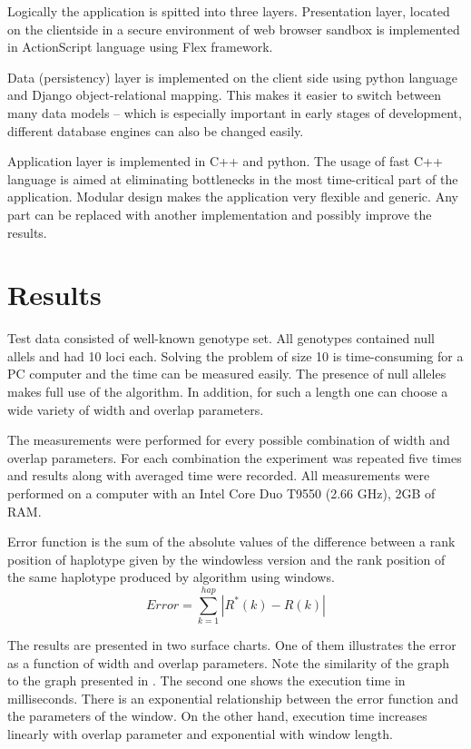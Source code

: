 \documentclass{llncs}
\begin{document}
Logically the application is spitted into three layers. 
Presentation layer, located on the clientside in a secure environment of web browser sandbox is implemented in ActionScript language using Flex framework. 


Data (persistency) layer is implemented on the client side using python language and Django object-relational mapping. 
This makes it easier to switch between many data models -- which is especially important in early stages of development, different database engines can also be changed easily.

Application layer is implemented in C++ and python. 
The usage of fast C++ language is aimed at eliminating bottlenecks in the most time-critical part of the application.
Modular design makes the application very flexible and generic. 
Any part can be replaced with another implementation and possibly improve the results. 


\section{Results}

Test data consisted of well-known genotype set. 
All genotypes contained null allels and had 10 loci each.
Solving the problem of size 10 is time-consuming for a PC computer and the time can be measured easily.
The presence of null alleles makes full use of the algorithm. 
In addition, for such a length one can choose a wide variety of width and overlap parameters.

The measurements were performed for every possible combination of width and overlap parameters.
For each combination the experiment was repeated five times and results along with averaged time were recorded.
All measurements were performed on a computer with an Intel Core Duo T9550 (2.66 GHz), 2GB of RAM.

Error function is the sum of the absolute values ​​of the difference between a rank position of haplotype given by the windowless version and the rank position of the same haplotype produced by algorithm using windows.
$$ Error = \sum_{k=1}^{hap} |R^{*}(k) - R(k)|$$

The results are presented in two surface charts.
One of them illustrates the error as a function of width and overlap parameters.
Note the similarity of the graph to the graph presented in \cite{gusev}.
The second one shows the execution time in milliseconds.
There is an exponential relationship between the error function and the parameters of the window.
On the other hand, execution time increases linearly with overlap parameter and exponential with window length.
\end{document}
